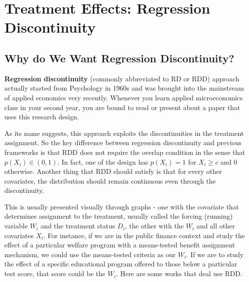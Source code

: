 
\chapter{Treatment Effects: Regression Discontinuity}
\section{Why do We Want Regression Discontinuity?}
\textbf{Regression discontinuity} (commonly abbreviated to RD or RDD) approach actually started from Psychology in 1960s and was brought into the mainstream of applied economics very recently. Whenever you learn applied microeconomics class in your second year, you are bound to read or present about a paper that uses this research design. \par
As its name suggests, this approach exploits the discontinuities in the treatment assignment. So the key difference between regression discontinuity and previous frameworks is that RDD does not require the overlap condition in the sense that $p(X_i)\in(0,1)$. In fact, one of the design has $p(X_i)=1$ for $X_i\geq c$ and $0$ otherwise. Another thing that RDD should satisfy is that for every other covariates, the distribution should remain continuous even through the discontinuity.\par
This is usually presented visually through graphs - one with the covariate that determines assignment to the treatment, usually called the forcing (running) variable $W_i$ and the treatment status $D_i$, the other with the $W_i$ and all other covariates $X_i$. For instance, if we are in the public finance context and study the effect of a particular welfare program with a means-tested benefit assignment mechanism, we could use the means-tested criteria as our $W_i$. If we are to study the effect of a specific educational program offered to those below a particular test score, that score could be the $W_i$. Here are some works that deal use RDD. 


